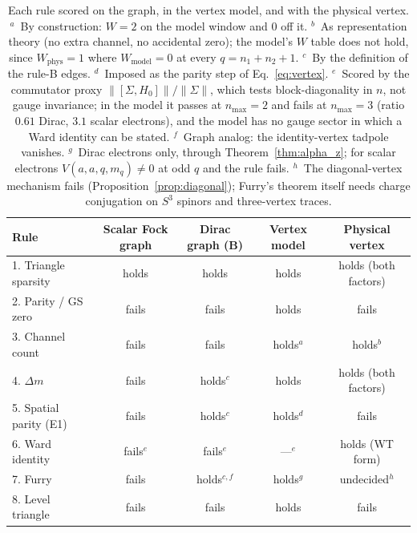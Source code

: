 \documentclass[11pt]{article}
\begin{document}
\begin{table}[h]
\centering
\small
\begin{tabular}{l c c c c}
\toprule
Rule & Scalar Fock graph & Dirac graph (B) & Vertex model & Physical vertex \\
\midrule
1. Triangle sparsity     & holds & holds & holds & holds (both factors) \\
2. Parity / GS zero      & fails & fails & holds & fails \\
3. Channel count         & fails & fails & holds$^{a}$ & holds$^{b}$ \\
4. $\Delta m$            & fails & holds$^{c}$ & holds & holds (both factors) \\
5. Spatial parity (E1)   & fails & holds$^{c}$ & holds$^{d}$ & fails \\
6. Ward identity         & fails$^{e}$ & fails$^{e}$ & ---$^{e}$ & holds (WT form) \\
7. Furry                 & fails & holds$^{c,f}$ & holds$^{g}$ & undecided$^{h}$ \\
8. Level triangle        & fails & fails & holds & fails \\
\bottomrule
\end{tabular}
\caption{Each rule scored on the graph, in the vertex model, and with
the physical vertex.
$^{a}$~By construction: $W = 2$ on the model window and $0$ off it.
$^{b}$~As representation theory (no extra channel, no accidental zero);
the model's $W$ table does not hold, since $W_{\mathrm{phys}} = 1$ where
$W_{\mathrm{model}} = 0$ at every $q = n_1 + n_2 + 1$.
$^{c}$~By the definition of the rule-B edges.
$^{d}$~Imposed as the parity step of Eq.~\eqref{eq:vertex}.
$^{e}$~Scored by the commutator proxy $\|[\Sigma, H_0]\|/\|\Sigma\|$, which
tests block-diagonality in $n$, not gauge invariance; in the model it
passes at $n_{\max} = 2$ and fails at $n_{\max} = 3$ (ratio $0.61$ Dirac,
$3.1$ scalar electrons), and the model has no gauge sector in which a
Ward identity can be stated.
$^{f}$~Graph analog: the identity-vertex tadpole vanishes.
$^{g}$~Dirac electrons only, through Theorem~\ref{thm:alpha_z}; for
scalar electrons $V(a, a, q, m_q) \ne 0$ at odd $q$ and the rule fails.
$^{h}$~The diagonal-vertex mechanism fails
(Proposition~\ref{prop:diagonal}); Furry's theorem itself needs charge
conjugation on $S^3$ spinors and three-vertex traces.}
\label{tab:census}
\end{table}
\end{document}

